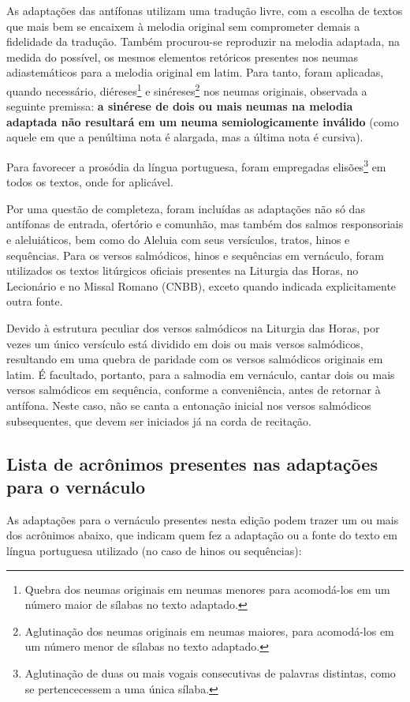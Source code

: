 As adaptações das antífonas utilizam uma tradução livre, com a escolha de textos que mais bem se encaixem à melodia original sem comprometer demais a fidelidade da tradução. Também procurou-se reproduzir na melodia adaptada, na medida do possível, os mesmos elementos retóricos presentes nos neumas adiastemáticos para a melodia original em latim. Para tanto, foram aplicadas, quando necessário, diéreses\footnote{Quebra dos neumas originais em neumas menores para acomodá-los em um número maior de sílabas no texto adaptado.} e sinéreses\footnote{Aglutinação dos neumas originais em neumas maiores, para acomodá-los em um número menor de sílabas no texto adaptado.} nos neumas originais, observada a seguinte premissa: \textbf{a sinérese de dois ou mais neumas na melodia adaptada não resultará em um neuma semiologicamente inválido} (como aquele em que a penúltima nota é alargada, mas a última nota é cursiva).

Para favorecer a prosódia da língua portuguesa, foram empregadas elisões\footnote{Aglutinação de duas ou mais vogais consecutivas de palavras distintas, como se pertencecessem a uma única sílaba.} em todos os textos, onde for aplicável.

Por uma questão de completeza, foram incluídas as adaptações não só das antífonas de entrada, ofertório e comunhão, mas também dos salmos responsoriais e aleluiáticos, bem como do Aleluia com seus versículos, tratos, hinos e sequências. Para os versos salmódicos, hinos e sequências em vernáculo, foram utilizados os textos litúrgicos oficiais presentes na Liturgia das Horas, no Lecionário e no Missal Romano (CNBB), exceto quando indicada explicitamente outra fonte.

Devido à estrutura peculiar dos versos salmódicos na Liturgia das Horas, por vezes um único versículo está dividido em dois ou mais versos salmódicos, resultando em uma quebra de paridade com os versos salmódicos originais em latim. É facultado, portanto, para a salmodia em vernáculo, cantar dois ou mais versos salmódicos em sequência, conforme a conveniência, antes de retornar à antífona. Neste caso, não se canta a entonação inicial nos versos salmódicos subsequentes, que devem ser iniciados já na corda de recitação.

\subsection*{Lista de acrônimos presentes nas adaptações para o vernáculo}

As adaptações para o vernáculo presentes nesta edição podem trazer um ou mais dos acrônimos abaixo, que indicam quem fez a adaptação ou a fonte do texto em língua portuguesa utilizado (no caso de hinos ou sequências):

